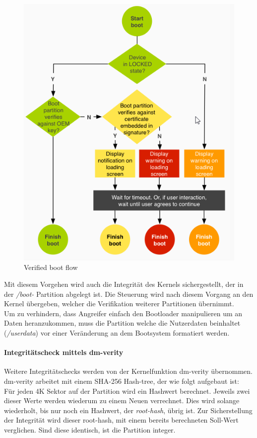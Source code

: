 	\begin{figure}[h]
		\centering
		\includegraphics[width=0.7\linewidth, height=0.5\textheight]{android_pages/graphics/VerifiedBoot}
		\caption[Verified boot flow\protect\cite{VerifyingBoot}]{Verified boot flow\protect\cite{VerifyingBoot}}
		\label{fig:VerifiedBoot}
	\end{figure}
	
\begin{flushleft}
	Mit diesem Vorgehen wird auch die Integrität des Kernels sichergestellt, der in der \textit{/boot-} Partition abgelegt ist. Die Steuerung wird nach diesem Vorgang an den Kernel übergeben, welcher die Verifikation weiterer Partitionen übernimmt.\newline\\

	Um zu verhindern, dass Angreifer einfach den Bootloader manipulieren um an Daten heranzukommen, muss die Partition welche die Nutzerdaten beinhaltet (\textit{/userdata}) vor einer Veränderung an dem Bootsystem formatiert werden.
\end{flushleft}
	
	\paragraph{Integritätscheck mittels dm-verity}
	Weitere Integritätschecks werden von der Kernelfunktion dm-verity übernommen.
	dm-verity arbeitet mit einem SHA-256 Hash-tree, der wie folgt aufgebaut ist:\\
	Für jeden 4K Sektor auf der Partition wird ein Hashwert berechnet. Jeweils zwei dieser Werte werden wiederum zu einem Neuen verrechnet. Dies wird solange wiederholt, bis nur noch ein Hashwert, der \textit{root-hash}, übrig ist. Zur Sicherstellung der Integrität wird dieser root-hash, mit einem bereits berechneten Soll-Wert verglichen. Sind diese identisch, ist die Partition integer.
	
